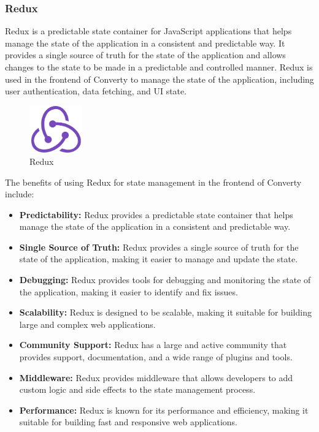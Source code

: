 \subsubsection{Redux}
Redux is a predictable state container for JavaScript applications that helps manage the state of the application in a consistent and predictable way. It provides a single source of truth for the state of the application and allows changes to the state to be made in a predictable and controlled manner. Redux is used in the frontend of Converty to manage the state of the application, including user authentication, data fetching, and UI state.

\begin{figure}[H]
    \centering
    \includegraphics[width=0.2\textwidth]{Images/redux.png}
    \caption{Redux}
    \label{fig:redux}
\end{figure}

The benefits of using Redux for state management in the frontend of Converty include:

\begin{itemize}
    \item \textbf{Predictability:} Redux provides a predictable state container that helps manage the state of the application in a consistent and predictable way.
    \item \textbf{Single Source of Truth:} Redux provides a single source of truth for the state of the application, making it easier to manage and update the state.
    \item \textbf{Debugging:} Redux provides tools for debugging and monitoring the state of the application, making it easier to identify and fix issues.
    \item \textbf{Scalability:} Redux is designed to be scalable, making it suitable for building large and complex web applications.
    \item \textbf{Community Support:} Redux has a large and active community that provides support, documentation, and a wide range of plugins and tools.
    \item \textbf{Middleware:} Redux provides middleware that allows developers to add custom logic and side effects to the state management process.
    \item \textbf{Performance:} Redux is known for its performance and efficiency, making it suitable for building fast and responsive web applications.
\end{itemize}

